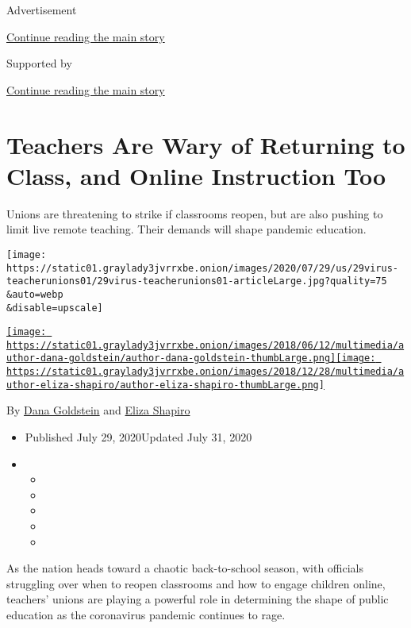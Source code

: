 Advertisement

\protect\hyperlink{after-top}{Continue reading the main story}

Supported by

\protect\hyperlink{after-sponsor}{Continue reading the main story}

\hypertarget{teachers-are-wary-of-returning-to-class-and-online-instruction-too}{%
\section{Teachers Are Wary of Returning to Class, and Online Instruction
Too}\label{teachers-are-wary-of-returning-to-class-and-online-instruction-too}}

Unions are threatening to strike if classrooms reopen, but are also
pushing to limit live remote teaching. Their demands will shape pandemic
education.

\texttt{[image: https://static01.graylady3jvrrxbe.onion/images/2020/07/29/us/29virus-teacherunions01/29virus-teacherunions01-articleLarge.jpg?quality=75\\\&auto=webp\\\&disable=upscale]}

\href{https://www.nytimes3xbfgragh.onion/by/dana-goldstein}{\texttt{[image: https://static01.graylady3jvrrxbe.onion/images/2018/06/12/multimedia/author-dana-goldstein/author-dana-goldstein-thumbLarge.png]}}\href{https://www.nytimes3xbfgragh.onion/by/eliza-shapiro}{\texttt{[image: https://static01.graylady3jvrrxbe.onion/images/2018/12/28/multimedia/author-eliza-shapiro/author-eliza-shapiro-thumbLarge.png]}}

By \href{https://www.nytimes3xbfgragh.onion/by/dana-goldstein}{Dana
Goldstein} and
\href{https://www.nytimes3xbfgragh.onion/by/eliza-shapiro}{Eliza
Shapiro}

\begin{itemize}
\item
  Published July 29, 2020Updated July 31, 2020
\item
  \begin{itemize}
  \item
  \item
  \item
  \item
  \item
  \end{itemize}
\end{itemize}

As the nation heads toward a chaotic back-to-school season, with
officials struggling over when to reopen classrooms and how to engage
children online, teachers' unions are playing a powerful role in
determining the shape of public education as the coronavirus pandemic
continues to rage.

